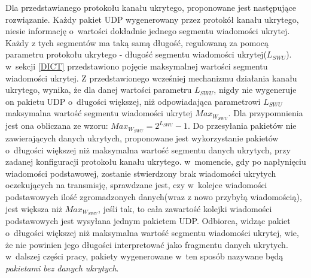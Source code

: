 \documentclass[a4paper, twoside, 12pt]{report}
\begin{document}
    Dla przedstawianego protokołu kanału ukrytego, proponowane jest następujące
    rozwiązanie. Każdy pakiet UDP wygenerowany przez protokół kanału ukrytego,
    niesie informację o~wartości dokładnie jednego segmentu wiadomości ukrytej.
    Każdy z tych segmentów ma taką samą długość, regulowaną za pomocą parametru
    protokołu ukrytego - długość segmentu wiadomości ukrytej(\( L_{SWU} \)). w~sekcji \ref{DICT}
    przedstawiono pojęcie maksymalnej wartości segmentu wiadomości ukrytej.
    Z przedstawionego wcześniej mechanizmu
    działania kanału ukrytego, wynika, że dla danej wartości parametru \( L_{SWU} \),
    nigdy nie wygeneruje on pakietu UDP o~długości większej, niż odpowiadająca parametrowi
    \( L_{SWU} \) maksymalna wartość segmentu wiadomości ukrytej \( Max_{W_{SWU}} \).
    Dla przypomnienia jest ona obliczana ze wzoru:
    \begin{math}
        Max_{W_{SWU}} = 2^{L_{SWU}} - 1
    \end{math}.
    Do przesyłania pakietów nie zawierających danych ukrytych, proponowane jest
    wykorzystanie pakietów o~długości większej niż maksymalna wartość segmentu
    danych ukrytych, przy zadanej konfiguracji protokołu kanału ukrytego. w~momencie,
    gdy po napłynięciu wiadomości podstawowej, zostanie stwierdzony brak wiadomości
    ukrytych oczekujących na transmisję, sprawdzane jest, czy w~kolejce wiadomości
    podstawowych ilość zgromadzonych danych(wraz z nowo przybyłą wiadomością), jest
    większa niż \( Max_{W_{SWU}} \), jeśli tak, to cała zawartość kolejki wiadomości
    podstawowych jest wysyłana jednym pakietem UDP. Odbiorca, widząc pakiet o~długości
    większej niż maksymalna wartość segmentu wiadomości ukrytej, wie, że nie powinien
    jego długości interpretować jako fragmentu danych ukrytych. w~dalszej części
    pracy, pakiety wygenerowane w~ten sposób nazywane będą \emph{pakietami bez danych ukrytych}.
\end{document}
